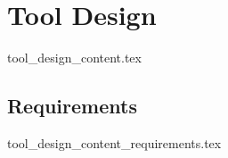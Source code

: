 \chapter{Tool Design}\label{sub:tool_design}
  {tool_design_content.tex}

\section{Requirements}
  {tool_design_content_requirements.tex}
